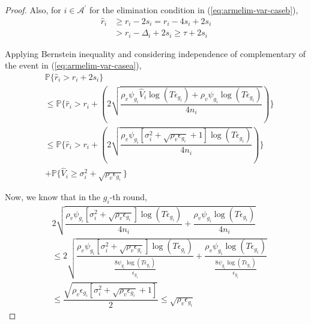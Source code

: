 \begin{proof}
Also, for ${i} \in \mathcal{A}^{'}$ for the elimination condition in (\ref{eq:armelim-var-caseb}), 
\begin{align*}
\hat{r}_{i}&\geq r_{i} - 2s_{i} = r_{i} - 4s_{i} + 2s_{i} \\
&> r_{i} - \Delta_{i} + 2s_{i}\geq \tau + 2s_{i} %
\end{align*}


Applying Bernstein inequality and considering independence of complementary of the event in (\ref{eq:armelim-var-casea}),
\begin{align}
&\mathbb{P}\lbrace\hat{r}_{i}> r_{i} + 2s_{i}\rbrace\\
&\leq \mathbb{P}\bigg\lbrace \hat{r}_{i} > r_{i}+ ( 2\sqrt{\dfrac{\rho_v\psi_{g_i} \hat{V}_{i}\log( T\epsilon_{g_{i}}) + \rho_v\psi_{g_i} \log{( T\epsilon_{g_{i}})}}{4n_{i}} }) \bigg\rbrace\\
&\leq \mathbb{P}\bigg\lbrace \hat{r}_{i} > r_{i}+ (2\sqrt{\dfrac{\rho_v\psi_{g_i} [\sigma_{i}^{2}+\sqrt{\rho_{v}\epsilon_{g_{i}}} + 1]\log( T\epsilon_{g_{i}})}{4n_{i}}})\bigg\rbrace \label{eq:prob_eq1}\\ 
&+ \mathbb{P}\bigg\lbrace \hat{V}_{i}\geq \sigma_{i}^{2}+\sqrt{\rho_{v}\epsilon_{g_{i}}}\bigg\rbrace \label{eq:prob_eq2}
\end{align}
 
 
Now, we know that in the $g_{i}$-th round,
\begin{align*}
& 2\sqrt{\dfrac{\rho_v\psi_{g_i} [\sigma_{i}^{2}+\sqrt{\rho_{v}\epsilon_{g_{i}}}]\log( T\epsilon_{g_{i}})}{4n_{i}} + \dfrac{\rho_v\psi_{g_i}  \log{(T\epsilon_{g_{i}})}}{4 n_{i}}}\\ &\leq  2\sqrt{\dfrac{\rho_v\psi_{g_i} [\sigma_{i}^{2}+\sqrt{\rho_{v}\epsilon_{g_{i}}}]\log( T\epsilon_{g_{i}})}{\frac{8\psi_{g_i}\log( T \epsilon_{g_{i}})}{\epsilon_{g_{i}}}} + \dfrac{\rho_v\psi_{g_i} \log{( T\epsilon_{g_{i}})}}{\frac{8\psi_{g_i}\log( T \epsilon_{g_{i}})}{\epsilon_{g_{i}}}}}\\
& \leq \dfrac{\sqrt{\rho_v \epsilon_{g_{i}}[\sigma_{i}^{2}+\sqrt{\rho_{v}\epsilon_{g_{i}}} + 1]}}{2}\leq \sqrt{\rho_v \epsilon_{g_{i}}}
\end{align*}



\end{proof}
